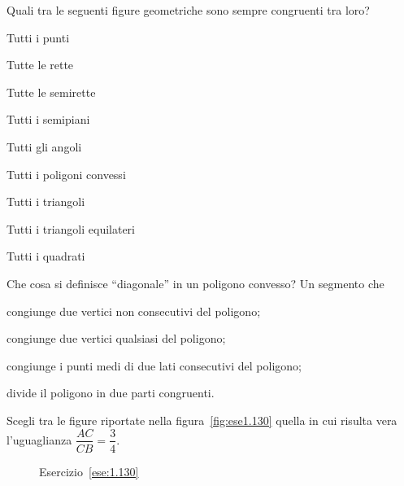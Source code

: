 \begin{esercizio}
Quali tra le seguenti figure geometriche sono sempre congruenti tra 
loro?
\begin{multicols}{2}
\begin{enumeratea}
\item Tutti i punti				
\tab\tab\boxV\quad\boxF
\item Tutte le rette				
\tab\tab\boxV\quad\boxF
\item Tutte le semirette				
\tab\boxV\quad\boxF
\item Tutti i semipiani				\tab\boxV\quad\boxF
\item Tutti gli angoli			\tab\tab\boxV\quad\boxF
\item Tutti i poligoni convessi		\tab\boxV\quad\boxF
\item Tutti i triangoli			\tab\tab\boxV\quad\boxF
\item Tutti i triangoli equilateri	\tab\boxV\quad\boxF
\item Tutti i quadrati			\tab\tab\boxV\quad\boxF
\end{enumeratea}
\end{multicols}
\end{esercizio}


\begin{esercizio}
Che cosa si definisce ``diagonale'' in un poligono convesso? Un 
segmento che
\begin{enumeratea}
\item congiunge due vertici non consecutivi del poligono;
\item congiunge due vertici qualsiasi del poligono;
\item congiunge i punti medi di due lati consecutivi del poligono;
\item divide il poligono in due parti congruenti.
\end{enumeratea}
\end{esercizio}

	
\begin{esercizio}
Scegli tra le figure riportate nella figura~\ref{fig:ese1.130} quella 
in cui risulta vera l'uguaglianza \(\dfrac{AC}{CB}=\dfrac{3}{4}\).
\end{esercizio}


\begin{inaccessibleblock}
 \begin{figure}[htb]
 \centering
 \caption{Esercizio~\ref{ese:1.130}}%
\end{figure}
\end{inaccessibleblock}

